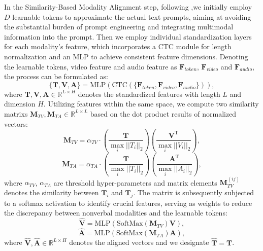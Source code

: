 \documentclass[letterpaper]{article} %
\begin{document}
 In the Similarity-Based Modality Alignment step, following \cite{zhou2022conditional,rao2022denseclip,10.1145/1143844.1143891},we initially employ $D$ learnable tokens to approximate the actual text prompts, aiming at avoiding the substantial burden of prompt engineering and integrating multimodal information into the prompt. Then we employ individual standardization layers for each modality's feature, which incorporates a CTC \cite{10.1145/1143844.1143891} module for length normalization and an MLP to achieve consistent feature dimensions. Denoting the learnable tokens, video feature and audio feature as $\textbf{F}_{token}$, $\textbf{F}_{video}$ and $\textbf{F}_{audio}$, the process can be formulated as:
\begin{equation}
    \{\textbf{T}, \textbf{V}, \textbf{A}\} = \text{MLP}(\text{CTC}(\{\textbf{F}_{token}, \textbf{F}_{video}, \textbf{F}_{audio}\})),
\end{equation}
where $\textbf{T}, \textbf{V}, \textbf{A} \in \mathbb{R}^{L \times H}$ denotes the standardized features with length $L$ and dimension $H$. Utilizing features within the same space, we compute two similarity matrixs $\textbf{M}_{TV}, \textbf{M}_{TA} \in \mathbb{R}^{L \times L}$ based on the dot product results of normalized vectors:
\begin{equation}
    \textbf{M}_{TV} = \alpha_{TV} \cdot (\frac{\textbf{T}}{\max \limits_{i} ||T_{i}||_{2}}) (\frac{\textbf{V}^{\text{T}}}{\max \limits_{i} ||V_{i}||_{2}}),
\end{equation}
\begin{equation}
    \textbf{M}_{TA} = \alpha_{TA} \cdot (\frac{\textbf{T}}{\max \limits_{i} ||T_{i}||_{2}}) (\frac{\textbf{A}^{\text{T}}}{\max \limits_{i} ||A_{i}||_{2}}),
\end{equation}
where $\alpha_{TV}$, $\alpha_{TA}$ are threshold hyper-parameters and matrix elements $\textbf{M}_{TV}^{(ij)}$ denotes the similarity between $\textbf{T}_{i}$ and $\textbf{T}_{j}$. The matrix is subsequently subjected to a softmax activation to identify crucial features, serving as weights to reduce the discrepancy between nonverbal modalities and the learnable tokens:
\begin{equation}
    \hat{\textbf{V}} = \text{MLP}(\text{SoftMax}(\textbf{M}_{TV})\textbf{V}),
\end{equation}
\begin{equation}
    \hat{\textbf{A}} = \text{MLP}(\text{SoftMax}(\textbf{M}_{TA})\textbf{A}),
\end{equation}
where $\hat{\textbf{V}}, \hat{\textbf{A}} \in \mathbb{R}^{L \times H}$ denotes the aligned vectors and we designate $\hat{\textbf{T}} = \textbf{T}$.
\end{document}
